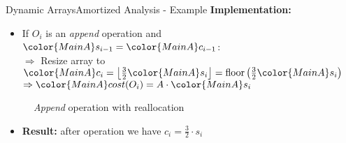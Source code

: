 \begin{frame}{Dynamic Arrays}{Amortized Analysis - Example}
  \textbf{Implementation:}
  \begin{itemize}
    \item
      If {\color{MainA}$O_i$} is an \textit{append} operation and
      ${\color{MainA}s_{i-1}} = {\color{MainA}c_{i-1}}$:\\
      $\Rightarrow$ Resize array to
      ${\color{MainA}c_i}
        = \left\lfloor\frac{3}{2} {\color{MainA}s_i} \right\rfloor
        = \mathrm{floor}\left(\frac{3}{2}{\color{MainA}s_i}\right)$\\
      $\Rightarrow {\color{MainA}cost(O_i)}
        = A \cdot {\color{MainA}s_i}$
  \end{itemize}
  \begin{figure}[!h]
    \def\FSAsize{7}\def\FSAelements{7}%
    \def\FSAcopy{0}\def\FSAdelete{0}\def\FSAinsert{0}%
    \def\FSAcopyarrow{0}%
    \def\FSAlabelsize{${\color{MainA}s_{i-1}} = 7$}%
    \def\FSAlabelcapacity{%
      ${\color{MainA}c_{i-1}}%
        = {\color{MainA}s_{i-1}} = 7$}%
    \hspace*{0.5em}\raisebox{2em}{$\Rightarrow$}\hspace*{0.5em}%
    \def\FSAsize{12}\def\FSAelements{0}%
    \def\FSAcopy{7}\def\FSAdelete{0}\def\FSAinsert{1}%
    \def\FSAlabelsize{${\color{MainA}s_i}
      = {\color{MainA}s_{i-1} + 1}=8$}%
    \def\FSAlabelcapacity{$12={\color{MainA}c_i}
      = \lfloor\frac{3}{2}{\color{MainA}s_i}\rfloor = 8$}%
    \caption{\textit{Append} operation with reallocation}
    \label{fig:dynamic_fields:amortized_analysis:append}
  \end{figure}
\begin{itemize}
  \item[] \textbf{Result:} after operation we have $c_i=\frac{3}{2}\cdot s_i$
  \end{itemize}
\end{frame}


